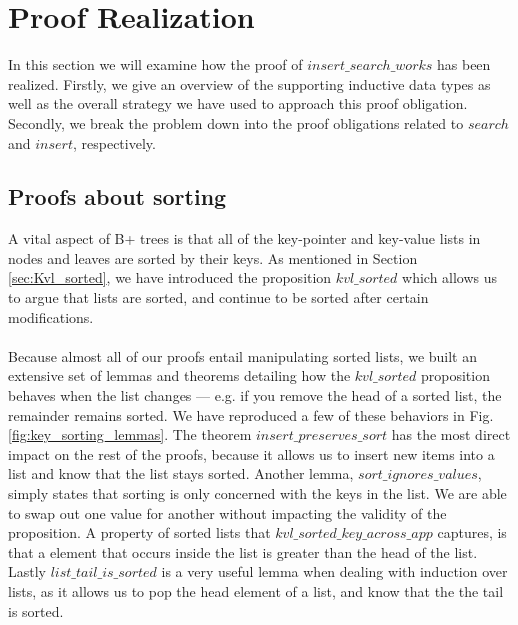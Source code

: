 \section{Proof Realization}
\label{sec:ProofRealization}
In this section we will examine how the proof of $insert\_search\_works$ has been realized. Firstly, we give an overview of the supporting inductive data types as well as the overall strategy we have used to approach this proof obligation. Secondly, we break the problem down into the proof obligations related to $search$ and $insert$, respectively. 

\subsection{Proofs about sorting}
A vital aspect of B+ trees is that all of the key-pointer and key-value lists in nodes and leaves are sorted by their keys. As mentioned in Section \ref{sec:Kvl_sorted}, we have introduced the proposition $kvl\_sorted$ which allows us to argue that lists are sorted, and continue to be sorted after certain modifications.

\paragraph{}
Because almost all of our proofs entail manipulating sorted lists, we built an extensive set of lemmas and theorems detailing how the $kvl\_sorted$ proposition behaves when the list changes --- e.g. if you remove the head of a sorted list, the remainder remains sorted. We have reproduced a few of these behaviors in Fig. \ref{fig:key_sorting_lemmas}. The theorem $insert\_preserves\_sort$ has the most direct impact on the rest of the proofs, because it allows us to insert new items into a list and know that the list stays sorted. Another lemma, $sort\_ignores\_values$, simply states that sorting is only concerned with the keys in the list. We are able to swap out one value for another without impacting the validity of the proposition. A property of sorted lists that $kvl\_sorted\_key\_across\_app$ captures, is that a element that occurs inside the list is greater than the head of the list. Lastly $list\_tail\_is\_sorted$ is a very useful lemma when dealing with induction over lists, as it allows us to pop the head element of a list, and know that the the tail is sorted.

